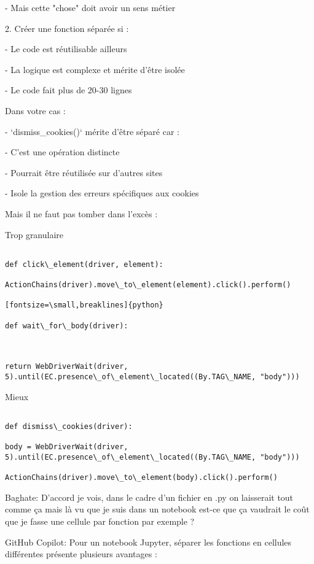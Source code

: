 - Mais cette "chose" doit avoir un sens métier

2. Créer une fonction séparée si :

- Le code est réutilisable ailleurs

- La logique est complexe et mérite d'être isolée

- Le code fait plus de 20-30 lignes

Dans votre cas :

- `dismiss\_cookies()` mérite d'être séparé car :

- C'est une opération distincte

- Pourrait être réutilisée sur d'autres sites

- Isole la gestion des erreurs spécifiques aux cookies

Mais il ne faut pas tomber dans l'excès :


  Trop granulaire

\begin{verbatim}

def click\_element(driver, element):

ActionChains(driver).move\_to\_element(element).click().perform()

[fontsize=\small,breaklines]{python}

def wait\_for\_body(driver):



return WebDriverWait(driver, 5).until(EC.presence\_of\_element\_located((By.TAG\_NAME, "body")))
\end{verbatim}
  Mieux

\begin{verbatim}

def dismiss\_cookies(driver):

body = WebDriverWait(driver, 5).until(EC.presence\_of\_element\_located((By.TAG\_NAME, "body")))

ActionChains(driver).move\_to\_element(body).click().perform()

\end{verbatim}

Baghate: D'accord je vois, dans le cadre d'un fichier en .py on laisserait tout comme ça mais là vu que je suis dans un notebook est-ce que ça vaudrait le coût que je fasse une cellule par fonction par exemple ?

GitHub Copilot: Pour un notebook Jupyter, séparer les fonctions en cellules différentes présente plusieurs avantages :


